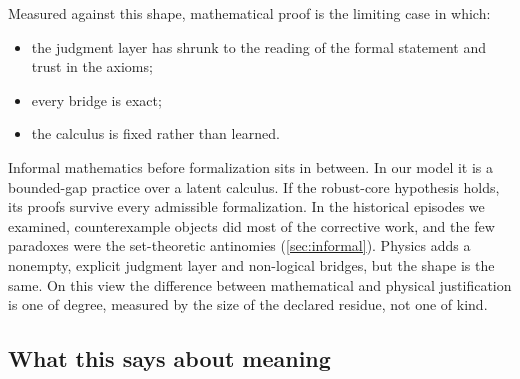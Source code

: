 Measured against this shape, mathematical proof is the limiting case in which:
\begin{itemize}
\item the judgment layer has shrunk to the reading of the formal statement and trust in the axioms;
\item every bridge is exact;
\item the calculus is fixed rather than learned.
\end{itemize}
Informal mathematics before formalization sits in between. In our model it is a bounded-gap practice over a latent calculus. If the robust-core hypothesis holds, its proofs survive every admissible formalization. In the historical episodes we examined, counterexample objects did most of the corrective work, and the few paradoxes were the set-theoretic antinomies (\cref{sec:informal}). Physics adds a nonempty, explicit judgment layer and non-logical bridges, but the shape is the same. On this view the difference between mathematical and physical justification is one of degree, measured by the size of the declared residue, not one of kind.

\subsection{What this says about meaning}\label{sec:philosophy:meaning}

